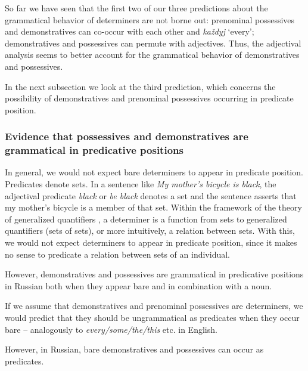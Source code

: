 \documentclass[output=paper,
colorlinks,
citecolor=brown,
newtxmath
]{langscibook}
\begin{document}

\noindent So far we have seen that the first two of our three predictions about the grammatical behavior of determiners are not borne out: prenominal possessives and demonstratives can co-occur with each other and \textit{každyj} `every'; demonstratives and possessives can permute with adjectives. Thus, the adjectival analysis seems to better account for the grammatical behavior of demonstratives and possessives.

In the next subsection we look at the third prediction, which concerns the possibility of demonstratives and prenominal possessives occurring in predicate position.


\subsubsection{Evidence that possessives and demonstratives are grammatical in predicative positions}\label{subsubsec:evidence}

In general, we would not expect bare determiners to appear in predicate position. Predicates denote sets. In a sentence like \textit{My mother’s bicycle is black}, the adjectival predicate \textit{black} or \textit{be black} denotes a set and the sentence asserts that my mother’s bicycle is a member of that set. Within the framework of the theory of generalized quantifiers \citep{BarwiseCooper1981}, a determiner is a function from sets to generalized quantifiers (sets of sets), or more intuitively, a relation between sets. With this, we would not expect determiners to appear in predicate position, since it makes no sense to predicate a relation between sets of an individual. 

However, demonstratives and possessives are grammatical in predicative positions in Russian both when they appear bare and in combination with a noun.



If we assume that demonstratives and prenominal possessives are determiners, we would predict that they should be ungrammatical as predicates when they occur bare -- analogously to \textit{every\slash some\slash the\slash this} etc. in English. 

However, in Russian, bare demonstratives and possessives can occur as predicates.
\end{document}
